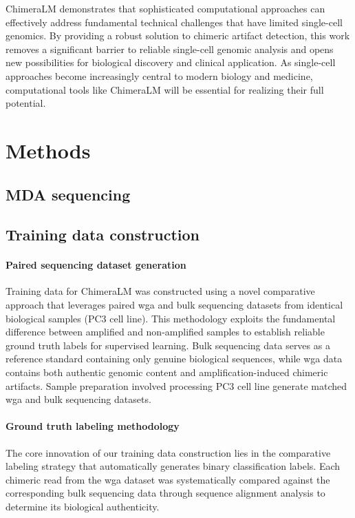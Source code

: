 \documentclass[pdflatex,sn-nature]{sn-jnl}%
\theoremstyle{thmstyleone}%
\theoremstyle{thmstyletwo}%
\theoremstyle{thmstylethree}%
\begin{document}
ChimeraLM demonstrates that sophisticated computational approaches can effectively address fundamental technical challenges that have limited single-cell genomics.
By providing a robust solution to chimeric artifact detection, this work removes a significant barrier to reliable single-cell genomic analysis and opens new possibilities for biological discovery and clinical application.
As single-cell approaches become increasingly central to modern biology and medicine, computational tools like ChimeraLM will be essential for realizing their full potential.

\section*{Methods}\label{sec:methods}

\subsection*{MDA sequencing}

\subsection*{Training data construction}

\paragraph{Paired sequencing dataset generation}
Training data for ChimeraLM was constructed using a novel comparative approach that leverages paired \gls{wga} and bulk sequencing datasets from identical biological samples (PC3 cell line).
This methodology exploits the fundamental difference between amplified and non-amplified samples to establish reliable ground truth labels for supervised learning.
Bulk sequencing data serves as a reference standard containing only genuine biological sequences, while \gls{wga} data contains both authentic genomic content and amplification-induced chimeric artifacts.
Sample preparation involved processing PC3 cell line generate matched \gls{wga} and bulk sequencing datasets.

\paragraph{Ground truth labeling methodology}
The core innovation of our training data construction lies in the comparative labeling strategy that automatically generates binary classification labels.
Each chimeric read from the \gls{wga} dataset was systematically compared against the corresponding bulk sequencing data through sequence alignment analysis to determine its biological authenticity.
\end{document}
